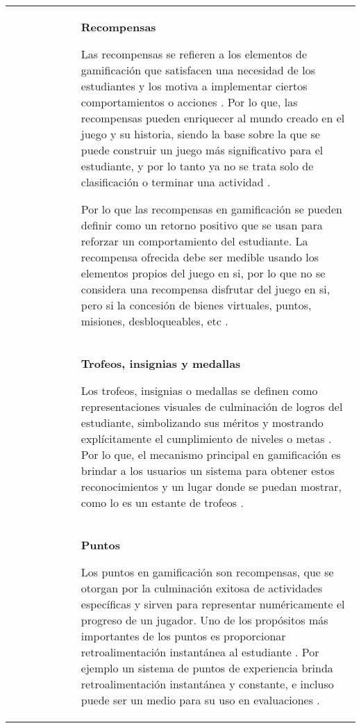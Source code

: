 \addtocounter{table}{-1}       %
\bgroup
\def\arraystretch{2}
\setlength{\tabcolsep}{0pt}
\begin{longtable}{C{0.2\linewidth} P{0.8\linewidth}}
 & \textbf{Recompensas}

Las recompensas se refieren a los elementos de gamificación que satisfacen una necesidad de los estudiantes y
los motiva a implementar ciertos comportamientos o acciones \cite{doi:10.1089/cyber.2012.0492}. Por lo que, 
las recompensas pueden enriquecer al mundo creado en el juego y su historia, siendo la base sobre la que se 
puede construir un juego más significativo para el estudiante, y por lo tanto ya no se trata solo de 
clasificación o terminar una actividad \cite{PRESTOPNIK2015492}.

Por lo que las recompensas en gamificación se pueden definir como un retorno positivo que se usan para
reforzar un comportamiento del estudiante. La recompensa ofrecida debe ser medible usando los elementos
propios del juego en si, por lo que no se considera una recompensa disfrutar del juego en si, pero si la
concesión de bienes virtuales, puntos, misiones, desbloqueables, etc \cite{Phillips2013}.
\\
 & \textbf{Trofeos, insignias y medallas} 

Los trofeos, insignias o medallas se definen como representaciones visuales de culminación de logros del
estudiante, simbolizando sus méritos y mostrando explícitamente el cumplimiento de niveles o metas
\cite{SAILER2017371}. Por lo que, el mecanismo principal en gamificación es brindar a los usuarios un sistema
para obtener estos reconocimientos y un lugar donde se puedan mostrar, como lo es un estante de trofeos
\cite{DAROCHASEIXAS201648}.
\\
 & \textbf{Puntos}

Los puntos en gamificación son recompensas, que se otorgan por la culminación exitosa de actividades 
específicas y sirven para representar numéricamente el progreso de un jugador. Uno de los propósitos más 
importantes de los puntos es proporcionar retroalimentación instantánea al estudiante \cite{SAILER2017371}.
Por ejemplo un sistema de puntos de experiencia brinda retroalimentación instantánea y constante, e incluso 
puede ser un medio para su uso en evaluaciones \cite{Danka2020}.


\end{longtable}
